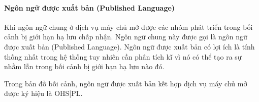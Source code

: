 












\paragraph{Ngôn ngữ được xuất bản (Published Language)}    Khi ngôn ngữ chung ở dịch vụ máy chủ mở được các nhóm phát triển trong bối cảnh bị giới hạn hạ lưu chấp nhận. Ngôn ngữ chung này được gọi là ngôn ngữ được xuất bản (Published Language). Ngôn ngữ được xuất bản có lợi ích là tính thống nhất trong hệ thống tuy nhiên cần phân tích kĩ vì nó có thể tạo ra sự nhầm lẫn trong bối cảnh bị giới hạn hạ lưu nào đó.

Trong bản đồ bối cảnh, ngôn ngữ được xuất bản kết hợp dịch vụ máy chủ mở được ký hiệu là OHS|PL.










